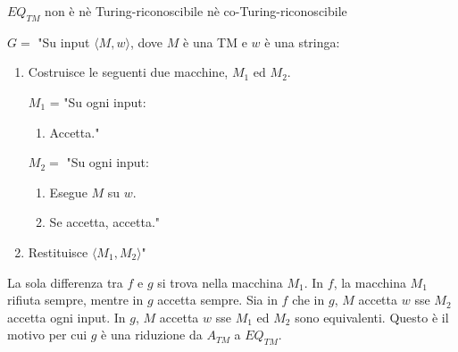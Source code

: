 \begin{Thm}{$EQ_{TM}$ non è nè Turing-riconoscibile nè co-Turing-riconoscibile}{}
\begin{demonstration}
$G=$ "Su input $\langle M, w\rangle$, dove $M$ è una TM e $w$ è una stringa:
\begin{enumerate}
    \item Costruisce le seguenti due macchine, $M_{1}$ ed $M_{2}$.

    $M_{1}$ = "Su ogni input:
    \begin{enumerate}
        \item Accetta."
    \end{enumerate}
    $M_{2} =$ "Su ogni input:
    \begin{enumerate}
        \item Esegue $M$ su $w$.
        \item Se accetta, accetta."
    \end{enumerate}
    \item Restituisce $\langle M_{1}, M_{2}\rangle$"
\end{enumerate}
La sola differenza tra $f$ e $g$ si trova nella macchina $M_{1}$. In $f$, la macchina $M_{1}$ rifiuta sempre, mentre in $g$ accetta sempre. Sia in $f$ che in $g$, $M$ accetta $w$ sse $M_{2}$ accetta ogni input. In $g$, $M$ accetta $w$ sse $M_{1}$ ed $M_{2}$ sono equivalenti. Questo è il motivo per cui $g$ è una riduzione da $A_{TM}$ a $EQ_{TM}$.
\end{demonstration}
\end{Thm}

